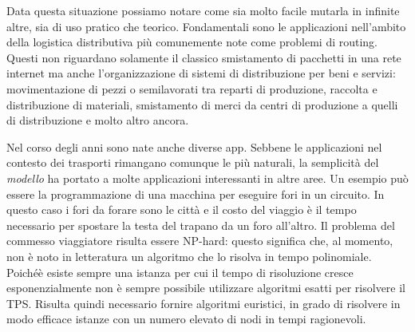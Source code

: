 \documentclass[11pt]{article}
\begin{document}
Data questa situazione possiamo notare come sia molto facile mutarla in infinite altre, sia di uso pratico che teorico. Fondamentali sono le applicazioni nell'ambito della logistica distributiva più comunemente note come problemi di routing. Questi non riguardano solamente il classico smistamento di pacchetti in una rete internet ma anche l’organizzazione di sistemi di distribuzione per beni e servizi:  movimentazione di pezzi o semilavorati tra reparti di produzione, raccolta e distribuzione di materiali, smistamento di merci da centri di produzione a quelli di distribuzione e molto altro ancora.

Nel corso degli anni sono nate anche diverse app.
Sebbene le applicazioni nel contesto dei trasporti rimangano comunque le più naturali, la semplicità del \textit{modello} ha portato a molte applicazioni interessanti in altre aree. Un esempio può essere la programmazione di una macchina per eseguire fori in un circuito. In questo caso i fori da forare sono le città e il costo del viaggio è il tempo necessario per spostare la testa del trapano da un foro all'altro. 
Il problema del commesso viaggiatore risulta essere NP-hard: questo significa che, al momento, non è noto in letteratura un algoritmo che lo risolva in tempo polinomiale. Poiché\`e esiste sempre una istanza per cui il tempo di risoluzione cresce esponenzialmente non è sempre possibile utilizzare algoritmi esatti per risolvere il TPS. Risulta quindi necessario fornire algoritmi euristici, in grado di risolvere in modo efficace istanze con un numero elevato di nodi in tempi ragionevoli.
\end{document}
